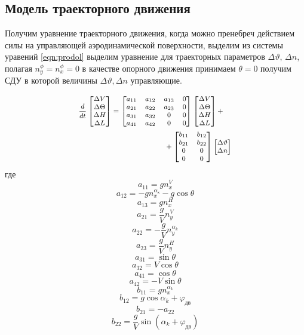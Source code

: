 \documentclass{article}
\begin{document}
\subsection{Модель траекторного движения}
Получим уравнение траекторного движения, когда можно пренебреч действием силы на управляющей аэродинамической поверхности, выделим из системы уравений \eqref{eqn:prodol} выделим уравнение для траекторных параметров $\Delta \vartheta, \, \Delta n$, полагая $n_y^\phi = n_x^\phi = 0$ в качестве опорного движения принимаем $\theta=0$ получим СДУ в которой величины $\Delta \vartheta, \Delta n$ управляющие.


\begin{equation}
	\medmath{
		\begin{multlined}
			\frac{d}{dt}
			\begin{bmatrix}
				\Delta V      \\
				\Delta \Theta \\
				\Delta H      \\
				\Delta L
			\end{bmatrix}
			=
			\begin{bmatrix}
				a_{11} & a_{12} & a_{13} & 0 \\
				a_{21} & a_{22} & a_{23} & 0 \\
				a_{31} & a_{32} & 0      & 0 \\
				a_{41} & a_{42} & 0      & 0 \\
			\end{bmatrix}
			\begin{bmatrix}
				\Delta V      \\
				\Delta \Theta \\
				\Delta H      \\
				\Delta L
			\end{bmatrix}
			+ \\ 
			+
			\begin{bmatrix}
				b_{11} & b_{12} \\
				b_{21} & b_{22} \\
				0      & 0      \\
				0      & 0      \\
			\end{bmatrix}
			\begin{bmatrix}
				\Delta \vartheta \\
				\Delta n         \\
			\end{bmatrix}
		\end{multlined}
	}
\end{equation}
где 
\[
	a_{11} = g n_x^V 
\]
\[
	a_{12} = -g n_x^{\alpha_\text{к}} - g \cos{\theta}
\]
\[
	a_{13} = g n_x^H
\]
\[
	a_{21} = \frac{g}{V} n_y ^V 
\]
\[
	a_{22} = -\frac{g}{V} n_y^{\alpha_k}
\]
\[
	a_{23} = \frac{g}{V} n_y^H
\]
\[
	a_{31} = \sin{\theta}
\]
\[
	a_{32} = V \cos{\theta}
\]
\[
	a_{41} = \cos{\theta}
\]
\[
	a_{42} = -V \sin{\theta}
\]
\[
	b_{11} = gn_x^{\alpha_k}
\]
\[
	b_{12} = g \cos{\alpha_k + \varphi_\text{дв}}
\]
\[
	b_{21} = -a_{22}
\]
\[
	b_{22} = \frac{g}{V} \sin{(\alpha_k + \varphi_\text{дв})}
\]
\end{document}
